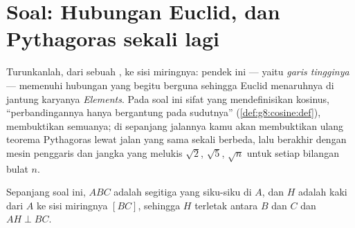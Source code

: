 \section{Soal: Hubungan Euclid, dan Pythagoras sekali lagi}

\begin{problem}[{Soal akhir pekan --- garis tinggi segitiga
siku-siku: $AB^2 = BH \times BC$, $AH^2 = BH \times HC$, bukti kedua
Pythagoras, dan mesin untuk melukis akar kuadrat}]
\label{pb:g8:cosine:1}
Turunkanlah, dari  sebuah ,  ke sisi miringnya:  pendek ini --- yaitu
\emph{garis tingginya} --- memenuhi hubungan yang begitu berguna
sehingga Euclid menaruhnya di jantung karyanya \emph{Elements}. Pada
soal ini sifat yang mendefinisikan kosinus, ``perbandingannya hanya
bergantung pada sudutnya''
(\cref{def:g8:cosine:def}), membuktikan semuanya; di sepanjang jalannya
kamu akan membuktikan ulang teorema Pythagoras lewat jalan yang sama
sekali berbeda, lalu berakhir dengan mesin penggaris dan jangka yang
melukis $\sqrt2$, $\sqrt5$, $\sqrt{n}$ untuk setiap bilangan bulat $n$.

Sepanjang soal ini, $ABC$ adalah segitiga yang siku-siku di $A$, dan
$H$ adalah kaki  dari $A$ ke sisi miringnya $[BC]$,
sehingga $H$ terletak antara $B$ dan $C$ dan $AH \perp BC$.


\end{problem}
